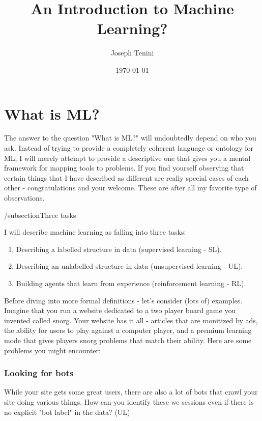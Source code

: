 \documentclass{article}
\title{An Introduction to Machine Learning?}
\author{Joseph Tenini}
\date{\today}
\begin{document}
\maketitle

\section{What is ML?}

The answer to the question "What is ML?" will undoubtedly depend on who you ask. Instead of trying to provide a completely coherent language or ontology for ML, I will merely attempt to provide a descriptive one that gives you a mental framework for mapping tools to problems. If you find yourself observing that certain things that I have described as different are really special cases of each other - congratulations and your welcome. These are after all my favorite type of observations.

/subsection{Three tasks}

I will describe machine learning as falling into three tasks:

\begin{enumerate}
    \item Describing a labelled structure in data (supervised learning - SL).
    \item Describing an unlabelled structure in data (unsupervised learning - UL).
    \item Building agents that learn from experience (reinforcement learning - RL).
\end{enumerate}


Before diving into more formal definitions - let's consider (lots of) examples. Imagine that you run a website dedicated to a two player board game you invented called snorg. Your website has it all - articles that are monitized by ads, the ability for users to play against a computer player, and a premium learning mode that gives players snorg problems that match their ability. Here are some problems you might encounter:

\subsubsection{Looking for bots}

While your site gets some great users, there are also a lot of bots that crawl your site doing various things. How can you identify these we sessions even if there is no explicit "bot label" in the data? (UL)
\end{document}
